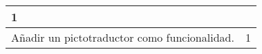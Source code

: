 \begin{table}[]
\begin{tabular}{|lc|}
        1                                                                                                                                                                                                            \\ \hline
        \multicolumn{1}{|l|}{Añadir un pictotraductor como funcionalidad.}                                                                                                                                         &
        1                                                                                                                                                                                                            \\ \hline
    \end{tabular}
\end{table}